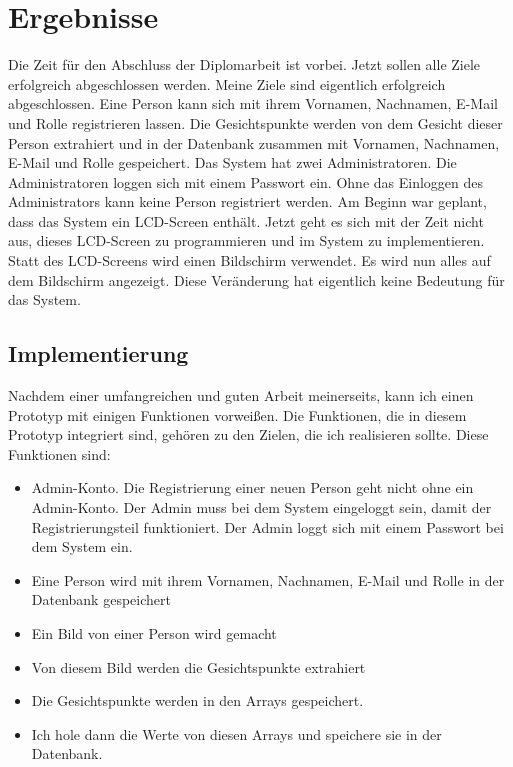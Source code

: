 \section{Ergebnisse}
Die Zeit f\"ur den Abschluss der Diplomarbeit ist vorbei. Jetzt sollen alle Ziele erfolgreich abgeschlossen werden. Meine Ziele sind eigentlich erfolgreich abgeschlossen. Eine Person kann sich mit ihrem Vornamen, Nachnamen, E-Mail und Rolle registrieren lassen. Die Gesichtspunkte werden von dem Gesicht dieser Person extrahiert und in der Datenbank zusammen mit Vornamen, Nachnamen, E-Mail und Rolle gespeichert. Das System hat zwei Administratoren. Die Administratoren loggen sich mit einem Passwort ein. Ohne das Einloggen des Administrators kann keine Person registriert werden. Am Beginn war geplant, dass das System ein LCD-Screen enth\"alt. Jetzt geht es sich mit der Zeit nicht aus, dieses LCD-Screen zu programmieren und im System zu implementieren. Statt des LCD-Screens wird einen Bildschirm verwendet. Es wird nun alles auf dem Bildschirm angezeigt. Diese Ver\"anderung hat eigentlich keine Bedeutung f\"ur das System. 
\subsection{Implementierung}
Nachdem einer umfangreichen und guten Arbeit meinerseits, kann ich einen Prototyp mit einigen Funktionen vorwei{\ss}en. Die Funktionen, die in diesem Prototyp integriert sind, geh\"oren zu den Zielen, die ich realisieren sollte. Diese Funktionen sind: 
\begin{itemize}
	\item Admin-Konto. Die Registrierung einer neuen Person geht nicht ohne ein Admin-Konto. Der Admin muss bei dem System eingeloggt sein, damit der Registrierungsteil funktioniert. Der Admin loggt sich mit einem Passwort bei dem System ein. 
	\item Eine Person wird mit ihrem Vornamen, Nachnamen, E-Mail und Rolle in der Datenbank gespeichert
	\item Ein Bild von einer Person wird gemacht
	\item Von diesem Bild werden die Gesichtspunkte extrahiert
	\item Die Gesichtspunkte werden in den Arrays gespeichert.
	\item Ich hole dann die Werte von diesen Arrays und speichere sie in der Datenbank.
\end{itemize}